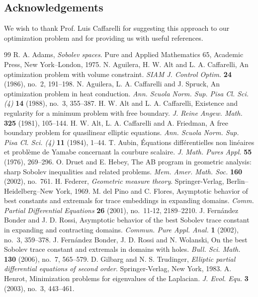 \documentclass[11pt]{amsart}
\theoremstyle{definition}
\theoremstyle{remark}
\numberwithin{equation}{section}
\begin{document}
\subsection*{Acknowledgements} We wish to thank Prof. Luis Caffarelli for suggesting this approach to our optimization problem and for providing us with useful references.

\begin{thebibliography}{99}
 R. A. Adams, \emph{Sobolev spaces}. Pure and Applied Mathematics 65, Academic Press, New York--London, 1975.
 N. Aguilera, H. W. Alt and L. A. Caffarelli, An optimization problem with volume constraint. \emph{SIAM J. Control Optim.} \textbf{24} (1986), no.~2, 191--198.
 N. Aguilera, L. A. Caffarelli and J. Spruck, An optimization problem in heat conduction. \emph{Ann. Scuola Norm. Sup. Pisa Cl. Sci. (4)} \textbf{14} (1988), no.~3, 355--387.
 H. W. Alt and L. A. Caffarelli, Existence and regularity for a minimum problem with free boundary. \emph{J. Reine Angew. Math.} \textbf{325} (1981), 105--144.
 H. W. Alt, L. A. Caffarelli and A. Friedman, A free boundary problem for quasilinear elliptic equations. \emph{Ann. Scuola Norm. Sup. Pisa Cl. Sci. (4)} \textbf{11} (1984), 1--44.
 T. Aubin, Équations différentielles non linéaires et problème de Yamabe concernant la courbure scalaire. \emph{J. Math. Pures Appl.} \textbf{55} (1976), 269--296.
 O. Druet and E. Hebey, The AB program in geometric analysis: sharp Sobolev inequalities and related problems. \emph{Mem. Amer. Math. Soc.} \textbf{160} (2002), no.~761.
 H. Federer, \emph{Geometric measure theory}. Springer-Verlag, Berlin--Heidelberg--New York, 1969.
 M. del Pino and C. Flores, Asymptotic behavior of best constants and extremals for trace embeddings in expanding domains. \emph{Comm. Partial Differential Equations} \textbf{26} (2001), no.~11-12, 2189--2210.
 J. Fernández Bonder and J. D. Rossi, Asymptotic behavior of the best Sobolev trace constant in expanding and contracting domains. \emph{Commun. Pure Appl. Anal.} \textbf{1} (2002), no.~3, 359--378.
 J. Fernández Bonder, J. D. Rossi and N. Wolanski, On the best Sobolev trace constant and extremals in domains with holes. \emph{Bull. Sci. Math.} \textbf{130} (2006), no.~7, 565--579.
 D. Gilbarg and N. S. Trudinger, \emph{Elliptic partial differential equations of second order}. Springer-Verlag, New York, 1983.
 A. Henrot, Minimization problems for eigenvalues of the Laplacian. \emph{J. Evol. Equ.} \textbf{3} (2003), no.~3, 443--461.

\end{thebibliography}
\end{document}

